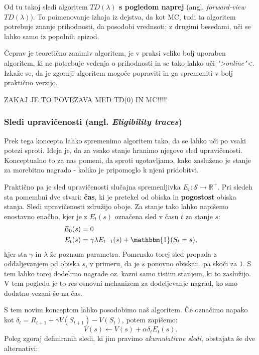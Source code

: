 \documentclass[12pt,a4paper]{amsart}
\theoremstyle{definition} %
\theoremstyle{plain} %
\begin{document}
Od tu takoj sledi algoritem \textbf{$TD(\lambda)$ s pogledom naprej} (angl. \textit{forward-view 
$TD(\lambda)$}). To poimenovanje izhaja iz dejstva, da kot MC, tudi ta algoritem potrebuje znanje
prihodnosti, da posodobi vrednsoti; z drugimi besedami, uči se lahko samo iz popolnih epizod.

Čeprav je teoretično zanimiv algoritem, je v praksi veliko bolj uporaben algoritem, ki ne potrebuje
vedenja o prihodnosti in se tako lahko uči \textit{">online"<}. Izkaže se, da je zgornji algoritem 
mogoče popraviti in ga spremeniti v bolj praktično verzijo.

ZAKAJ JE TO POVEZAVA MED TD(0) IN MC!!!!!

\subsubsection{Sledi upravičenosti (angl. \textit{Eligibility traces})}
Prek tega koncepta lahko spremenimo algoritem tako, da se lahko uči po vsaki potezi sproti. Ideja 
je, da za vsako stanje hranimo njegovo sled upravičenosti. Konceptualno to za nas pomeni, da sproti 
ugotavljamo, kako zasluženo je stanje za morebitno nagrado - koliko je pripomoglo k njeni 
pridobitvi.

Praktično pa je sled upravičenosti slučajna spremenljivka $E_t: \mathcal{S} \rightarrow \mathbb{R}^+$. 
Pri sledeh sta pomembni dve stvari: \textbf{čas}, ki je pretekel od obiska in \textbf{pogostost} 
obiska stanja. Sledi upravičenosti združijo oboje. Za stanje tako lahko napišemo enostavno enačbo, 
kjer je z $E_t(s)$ označena sled v času $t$ za stanje $s$:
\begin{align*}
    E_0(s) &= 0 \\
    E_t(s) &= \gamma \lambda E_{t-1}(s) + \mathbbm{1}(S_t = s),
\end{align*}
kjer sta $\gamma$ in $\lambda$ že poznana parametra. Pomensko torej sled propada z oddaljevanjem 
od obiska $s$, v primeru, da je $s$ ponovno obiskan, pa skoči za $1$. S tem lahko torej dodelimo 
nagrade oz. kazni samo tistim stanjem, ki to zaslužijo. V tem pogledu je to res osnovni mehanizem 
za dodeljevanje nagrad, ko smo dodatno vezani še na čas.

S tem novim konceptom lahko posodobimo naš algoritem. Če označimo napako kot $\delta_t = R_{t+1} + 
\gamma V(S_{t+1}) - V(S_t)$, potem zapišemo: 
\begin{equation}\label{TDlambda}
    V(s) \leftarrow V(s) + \alpha \delta_t E_t(s).
\end{equation}
Poleg zgoraj definiranih sledi, ki jim pravimo \textit{akumulativne sledi}, obstajata še dve 
alternativi:
\end{document}

